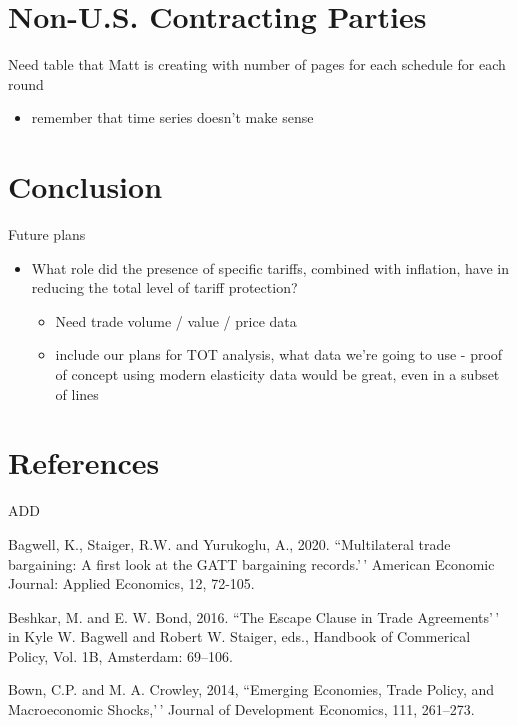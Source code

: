 \documentclass[
  12pt,
]{article}
\providecommand{\tightlist}{%
  \setlength{\itemsep}{0pt}\setlength{\parskip}{0pt}}
\begin{document}
\hypertarget{non-u.s.-contracting-parties}{%
\section{Non-U.S. Contracting Parties}\label{non-u.s.-contracting-parties}}

Need table that Matt is creating with number of pages for each schedule for each round

\begin{itemize}
\tightlist
\item
  remember that time series doesn't make sense
\end{itemize}

\hypertarget{conclusion}{%
\section{Conclusion}\label{conclusion}}

Future plans

\begin{itemize}
\item
  What role did the presence of specific tariffs, combined with inflation, have in reducing the total level of tariff protection?

  \begin{itemize}
  \item
    Need trade volume / value / price data
  \item
    include our plans for TOT analysis, what data we're going to use - proof of concept using modern elasticity data would be great, even in a subset of lines
  \end{itemize}
\end{itemize}

\hypertarget{references}{%
\section{References}\label{references}}

ADD

Bagwell, K., Staiger, R.W. and Yurukoglu, A., 2020. ``Multilateral trade bargaining: A first look at the GATT bargaining records.'\,' American Economic Journal: Applied Economics, 12, 72-105.

Beshkar, M. and E. W. Bond, 2016. ``The Escape Clause in Trade Agreements'\,' in Kyle W. Bagwell and Robert W. Staiger, eds., Handbook of Commerical Policy, Vol. 1B, Amsterdam: 69--106.

Bown, C.P. and M. A. Crowley, 2014, ``Emerging Economies, Trade Policy, and Macroeconomic Shocks,'\,' Journal of Development Economics, 111, 261--273.
\end{document}
